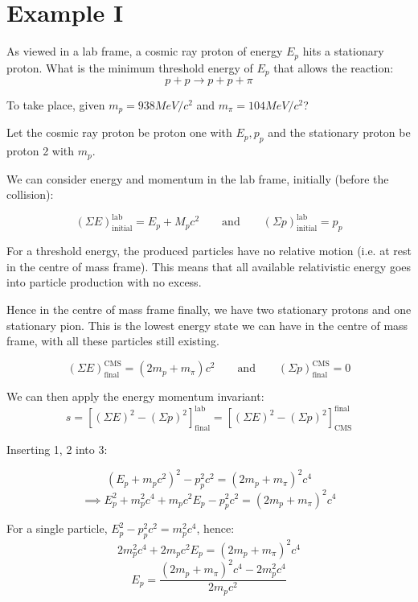 
\section{Example I}
As viewed in a lab frame, a cosmic ray proton of energy $E_p$ hits a stationary proton. What is the minimum threshold energy of $E_p$ that allows the reaction:
\[
    p + p \to p + p + \pi
\]

To take place, given $m_p = 938 \si{MeV / c^2}$ and $m_\pi = 104 \si{MeV / c^2}$?

Let the cosmic ray proton be proton one with $E_p, p_p$ and the stationary proton be proton 2 with $m_p$.

We can consider energy and momentum in the lab frame, initially (before the collision):

\[
    \left(\Sigma E\right)_\text{initial}^\text{lab} = E_p + M_p c^2 \qquad \text{and} \qquad \left(\Sigma p\right)_\text{initial}^\text{lab} = p_p \tag{1}
\]

For a threshold energy, the produced particles have no relative motion (i.e. at rest in the centre of mass frame). This means that all available relativistic energy goes into particle production with no excess.

Hence in the centre of mass frame finally, we have two stationary protons and one stationary pion. This is the lowest energy state we can have in the centre of mass frame, with all these particles still existing.

\[
    \left(\Sigma E\right)^\text{CMS}_\text{final} = (2 m_p + m_\pi) c^2 \qquad \text{and} \qquad \left(\Sigma p\right)^\text{CMS}_\text{final} = 0 \tag{2}
\]

We can then apply the energy momentum invariant:
\[
    s = \left[\left(\Sigma E\right)^2 - \left(\Sigma p\right)^2\right]_\text{final}^\text{lab} = \left[\left(\Sigma E\right)^2 - \left(\Sigma p\right)^2\right]_\text{CMS}^\text{final} \tag{3}  
\]

Inserting 1, 2 into 3:

\[
    \left(E_p + m_p c^2\right)^2 - p_p^2c^2 = \left(2 m_p + m_\pi\right)^2 c^4
\]
\[
    \implies E_p^2 + m_p^2 c^4 + m_p c^2 E_p - p_p^2 c^2 = \left(2 m_p + m_\pi\right)^2 c^4
\]

For a single particle, $E_p^2 - p_p^2 c^2 = m_p^2 c^4$, hence:
\[
    2 m_p^2 c^4 + 2 m_p c^2 E_p = \left(2 m_p + m_\pi\right)^2 c^4
\]
\[
    E_p = \frac{\left(2 m_p + m_\pi\right)^2 c^4 - 2 m_p^2 c^4}{2 m_p c^2}
\]

